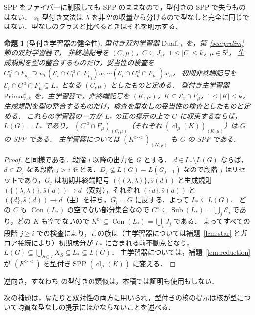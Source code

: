 \documentclass[11pt,a4paper]{ltjsarticle}
\numberwithin{equation}{section}
\theoremstyle{plain}
\newtheorem{proposition}[theorem]{命題}
\theoremstyle{definition}
\theoremstyle{remark}
\theoremstyle{plain}
\newcommand{\eps}{\lambda}
\newcommand{\R}{^{\rhd}}
\newcommand{\Lc}{^{\lhd}}
\newcommand{\RL}{^{\rhd\lhd}}
\newcommand{\cl}{\operatorname{cl}}
\newcommand{\Sub}{\operatorname{Sub}}
\newcommand{\Con}{\operatorname{Con}}
\begin{document}
SPP をファイバーに制限しても SPP のままなので，型付きの SPP で失うものはない．
$s_0$-型付き文法は $\eps$ を非空の収量から分けるので型なしと完全に同じではない．型なしのクラスと比べるときはそれを明示する．

\begin{proposition}[型付き学習器の健全性]\label{prop:learners}
\emph{型付き双対学習器} $\mathrm{Dual}^s_{r,k}$ を，第~\ref{sec:prelim} 節の双対学習器で，
非終端記号を $(C,\mu)$，$C\subseteq J_i$，$1\le|C|\le k$，$\mu\in\mathsf S^\sharp$，
生成規則を型の整合するものだけ，妥当性の検査を
$C_0\Lc\cap F_{\mu_0}\supseteq w_0(\mathcal E_i\cap C_1\Lc\cap F_{\mu_1})w_1\cdots(\mathcal E_i\cap C_n\Lc\cap F_{\mu_n})w_n$，
初期非終端記号を $\mathcal E_i\cap C\Lc\cap F_\mu\subseteq L_*$ となる $(C,\mu)$ としたものと定める．
\emph{型付き主学習器} $\mathrm{Primal}^s_{r,k}$ を，主学習器で，非終端記号を $(K,\mu)$，$K\subseteq\mathcal E_i\cap F_\mu$，$1\le|K|\le k$，
生成規則を型の整合するものだけ，検査を型なしの妥当性の検査としたものと定める．
これらの学習器の一方が $L_*$ の正の提示の上で $G$ に収束するならば，$L(G)=L_*$ であり，
$(C\Lc\cap F_\mu)_{(C,\mu)}$（それぞれ $(\cl_\mu(K))_{(K,\mu)}$）は $G$ の SPP である．
主学習器については $(K\RL)_{(K,\mu)}$ も $G$ の SPP である．
\end{proposition}
\begin{proof}
\citet[Theorems~3 と~4 の証明]{ky2017} と同様である．段階 $i$ 以降の出力を $G$ とする．
$d\in L_*\setminus L(G)$ ならば，$d\in D_j$ なる段階 $j>i$ をとる．$D_j\not\subseteq L(G)=L(G_{j-1})$ なので段階 $j$ はリセットであり，$G_j$ は初期非終端記号 $(\{(\eps,\eps)\},\widehat s(d))$ と生成規則
$(\{(\eps,\eps)\},\widehat s(d))\to d$（双対），それぞれ $(\{d\},\widehat s(d))$ と $(\{d\},\widehat s(d))\to d$（主）を持ち，$G_j=G$ に反する．よって $L_*\subseteq L(G)$．
どの $C$ も $\Con(L_*)$ の空でない部分集合なので $C\Lc\subseteq\Sub(L_*)=\bigcup_j\mathcal E_j$ であり，どの $K$ も空でないので $K\R\subseteq\Con(L_*)=\bigcup_jJ_j$ である．
よってすべての段階 $j\ge i$ での検査により，この族は（主学習器については補題~\ref{lem:star} とガロア接続により）初期成分が $L_*$ に含まれる前不動点となり，
$L(G)\subseteq\bigcup_{S\in I}X_S\subseteq L_*\subseteq L(G)$．
主学習器については，補題~\ref{lem:reduction} が $(K\RL)$ を型付き SPP $(\cl_\mu(K))$ に変える．
\end{proof}
逆向き，すなわち \citet[Theorems~5--6]{ky2017} の型付きの類似は，本稿では証明も使用もしない．

次の補題は，隔たりと双対性の両方に用いられ，型付きの核の提示は核が型について均質な型なしの提示にほかならないことを述べる．
\end{document}
